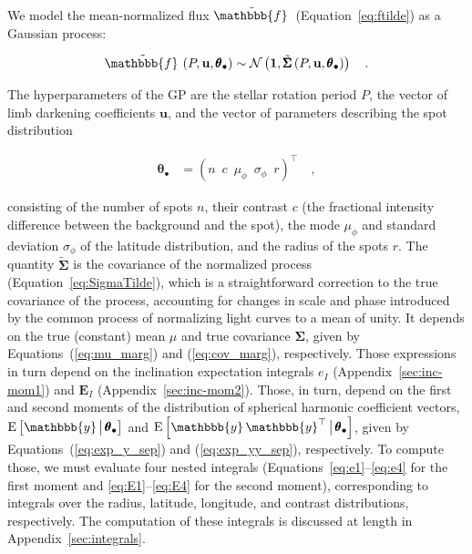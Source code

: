 \documentclass[modern,linenumbers]{aastex62}
\begin{document}
We model the mean-normalized flux $\tilde{\mathbbb{f}\hspace{0.2em}}$
(Equation~\ref{eq:ftilde}) as a Gaussian process:
%
\begin{linenomath}\begin{align}
        \tilde{\mathbbb{f}\hspace{0.2em}}
        \left(P, \mathbf{u}, \pmb{\theta}_\bullet\right)
        \sim
        \mathcal{N}\left(
        \mathbf{1},
        \tilde{\pmb{\Sigma}} \left(P, \mathbf{u}, \pmb{\theta}_\bullet\right)
        \right)
        \quad.
    \end{align}\end{linenomath}
%
The hyperparameters of the GP are
the stellar rotation period $P$,
the vector of limb darkening
coefficients $\mathbf{u}$, and the vector of parameters describing the
spot distribution
%
\begin{linenomath}\begin{align}
        \pmb{\theta}_\bullet
         & =
        \left(
        n
        \,\,\,
        c
        \,\,\,
        \mu_\phi
        \,\,\,
        \sigma_\phi
        \,\,\,
        r
        \right)^\top
        \quad,
    \end{align}\end{linenomath}
%
consisting of the number of spots $n$, their contrast $c$ (the fractional
intensity difference between the background and the spot),
the mode $\mu_\phi$ and standard deviation $\sigma_\phi$ of the latitude
distribution, and the radius of the spots $r$.
The quantity $\tilde{\pmb{\Sigma}}$ is the covariance of the normalized process
(Equation~\ref{eq:SigmaTilde}), which is a straightforward correction to the
true covariance of the process, accounting for
changes in scale and phase introduced by the common process of
normalizing light curves to a mean of unity. It depends on the
true (constant) mean $\mu$
and true covariance $\pmb{\Sigma}$,
given by Equations~(\ref{eq:mu_marg}) and (\ref{eq:cov_marg}),
respectively.
Those expressions in turn depend on the inclination expectation integrals
$e_I$ (Appendix~\ref{sec:inc-mom1}) and $\mathbf{E}_I$
(Appendix~\ref{sec:inc-mom2}). Those, in turn, depend on the first and
second moments of the distribution of spherical harmonic coefficient vectors,
$\mathrm{E}\left[ \mathbbb{y} \, \big| \, \pmb{\theta}_\bullet \right]$
and
$\mathrm{E}\left[ \mathbbb{y} \, \mathbbb{y}^\top \, \big| \, \pmb{\theta}_\bullet \right]$,
given by Equations~(\ref{eq:exp_y_sep}) and (\ref{eq:exp_yy_sep}), respectively.
To compute those, we must evaluate four nested integrals
(Equations~\ref{eq:e1}--\ref{eq:e4} for the first moment
and \ref{eq:E1}--\ref{eq:E4} for the second moment), corresponding to integrals
over the radius, latitude, longitude, and contrast distributions, respectively.
The computation of these integrals is discussed at length in Appendix~\ref{sec:integrals}.
\end{document}
